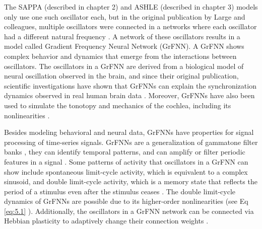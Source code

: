 \documentclass{report}
\begin{document}
The SAPPA (described in chapter 2) and ASHLE (described in chapter 3) models only use one such oscillator each, but in the original publication by Large and colleagues, multiple oscillators were connected in a networks where each oscillator had a different natural frequency \cite{large2010canonical}. A network of these oscillators results in a model called Gradient Frequency Neural Network (GrFNN). A GrFNN shows complex behavior and dynamics that emerge from the interactions between oscillators. The oscillators in a GrFNN are derived from a biological model of neural oscillation observed in the brain, and since their original publication, scientific investigations have shown that GrFNNs can explain the synchronization dynamics observed in real human brain data \cite{tal2017neural}. Moreover, GrFNNs have also been used to simulate the tonotopy and mechanics of the cochlea, including its nonlinearities \cite{lerud2019canonical}.

Besides modeling behavioral and neural data, GrFNNs have properties for signal processing of time-series signals\cite{kim2015signal}. GrFNNs are a generalization of gammatone filter banks \cite{large2015learning}, they can identify temporal patterns, and can amplify or filter periodic features in a signal \cite{kim2015signal}. Some patterns of activity that oscillators in a GrFNN can show include spontaneous limit-cycle activity, which is equivalent to a complex sinusoid, and double limit-cycle activity, which is a memory state that reflects the period of a stimulus even after the stimulus ceases \cite{kim2015signal}. The double limit-cycle dynamics of GrFNNs are possible due to its higher-order nonlinearities (see Eq \eqref{eq:5.1} \cite{large2010canonical, kim2015signal}). Additionally, the oscillators in a GrFNN network can be connected via Hebbian plasticity to adaptively change their connection weights \cite{lambert2016adaptive, kim2017dynamical}. 
\end{document}
